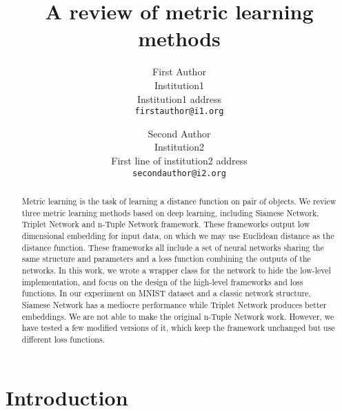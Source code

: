 \documentclass[10pt,twocolumn,letterpaper]{article}
\begin{document}
\title{A review of metric learning methods}

\author{First Author\\
Institution1\\
Institution1 address\\
{\tt\small firstauthor@i1.org}
\and
Second Author\\
Institution2\\
First line of institution2 address\\
{\tt\small secondauthor@i2.org}
}

\maketitle

\begin{abstract}
   Metric learning is the task of learning a distance function on pair of objects. We review three metric learning methods based on deep learning, including Siamese Network, Triplet Network and n-Tuple Network framework. These frameworks output low dimensional embedding for input data, on which we may use Euclidean distance as the distance function. These frameworks all include a set of neural networks sharing the same structure and parameters and a loss function combining the outputs of the networks. In this work, we wrote a wrapper class for the network to hide the low-level implementation, and focus on the design of the high-level frameworks and loss functions. In our experiment on MNIST dataset and a classic network structure, Siamese Network has a mediocre performance while Triplet Network produces better embeddings. We are not able to make the original n-Tuple Network work. However, we have tested a few modified versions of it, which keep the framework unchanged but use different loss functions.
\end{abstract}

\section{Introduction}


{\small


}
\end{document}
